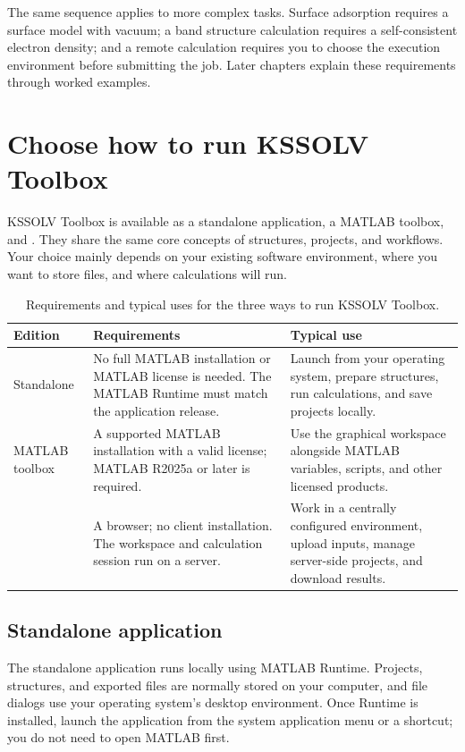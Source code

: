 The same sequence applies to more complex tasks. Surface adsorption requires a surface model with vacuum; a band structure calculation requires a self-consistent electron density; and a remote calculation requires you to choose the execution environment before submitting the job. Later chapters explain these requirements through worked examples.

\section{Choose how to run KSSOLV Toolbox}
KSSOLV Toolbox is available as a standalone application, a MATLAB\regmark{} toolbox, and \ksonline{}. They share the same core concepts of structures, projects, and workflows. Your choice mainly depends on your existing software environment, where you want to store files, and where calculations will run.

\begin{table}[!htb]
\centering
\caption{Requirements and typical uses for the three ways to run KSSOLV Toolbox.}
\label{tab:usage-modes}
\begin{tabularx}{\linewidth}{>{\RaggedRight\arraybackslash}p{23mm}>{\RaggedRight\arraybackslash}X>{\RaggedRight\arraybackslash}X}
\toprule
Edition & Requirements & Typical use \\
\midrule
Standalone & No full MATLAB\regmark{} installation or MATLAB\regmark{} license is needed. The MATLAB\regmark{} Runtime must match the application release. & Launch from your operating system, prepare structures, run calculations, and save projects locally. \\
MATLAB\regmark{} toolbox & A supported MATLAB\regmark{} installation with a valid license; MATLAB\regmark{} R2025a or later is required. & Use the graphical workspace alongside MATLAB\regmark{} variables, scripts, and other licensed products. \\
\ksonline{} & A browser; no client installation. The workspace and calculation session run on a server. & Work in a centrally configured environment, upload inputs, manage server-side projects, and download results. \\
\bottomrule
\end{tabularx}
\end{table}

\subsection{Standalone application}
The standalone application runs locally using MATLAB\regmark{} Runtime. Projects, structures, and exported files are normally stored on your computer, and file dialogs use your operating system's desktop environment. Once Runtime is installed, launch the application from the system application menu or a shortcut; you do not need to open MATLAB\regmark{} first.

